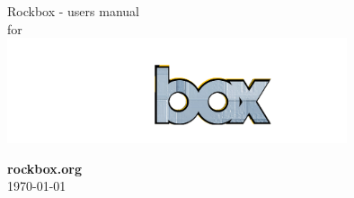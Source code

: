 \thispagestyle{empty}
\vspace*{0.3cm}
\begin{center}
\Huge{Rockbox - users manual\\for\\\playername}\vspace{1cm}
\includegraphics[width=10cm]{frontpage/rockbox3540.png}
\vspace{\fill}

\large \textbf{rockbox.org}\ \\\today


\end{center}

\pagebreak
\thispagestyle{empty}
\cleardoublepage
